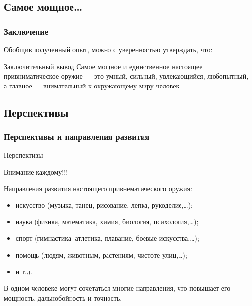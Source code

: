 \subsection{Самое мощное\ldots}

\begin{frame}
    \frametitle{Заключение}
    
    Обобщив полученный опыт, можно с уверенностью утверждать, что:
    
    \begin{block}{Заключительный вывод}
        Самое мощное и \alert{единственное настоящее} привниматическое оружие --- это умный, сильный, увлекающийся, любопытный, а главное --- \alert{внимательный к окружающему миру} человек.
    \end{block}
\end{frame}

    
\subsection{Перспективы}

\begin{frame}
    \frametitle{Перспективы и направления развития}
    
    \begin{block}{Перспективы}
        \begin{center}
            \alert{Внимание каждому!!!}
        \end{center}
    \end{block}
    
    Направления развития \alert{настоящего} привнематического оружия: 
    \begin{itemize}
        \item искусство (музыка, танец, рисование, лепка, рукоделие,\ldots);
        \item наука (физика, математика, химия, биология, психология,\ldots);
        \item спорт (гимнастика, атлетика, плавание, боевые искусства,\ldots);
        \item помощь (людям, животным, растениям, чистоте улиц,\ldots);
        \item и т.д.
    \end{itemize}
    
    \begin{block}{}
        \begin{center}
            В \alert{одном} человеке могут сочетаться \alert{многие} направления, что повышает его \alert{мощность}, \alert{дальнобойность} и \alert{точность}.
        \end{center}
    \end{block}
    
\end{frame}


